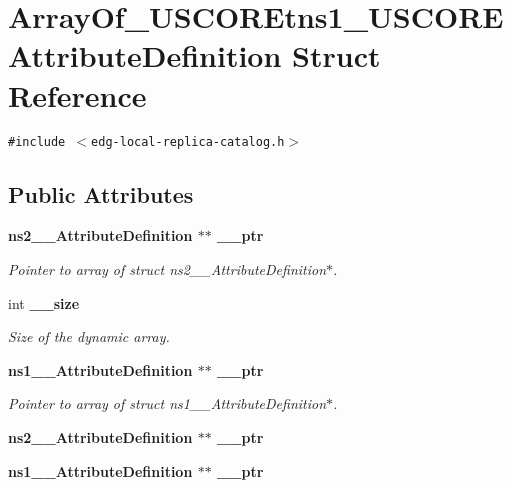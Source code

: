 \section{Array\-Of\_\-USCOREtns1\_\-USCOREAttribute\-Definition Struct Reference}
\label{structArrayOf__USCOREtns1__USCOREAttributeDefinition}
{\tt \#include $<$edg-local-replica-catalog.h$>$}

\subsection*{Public Attributes}
\begin{CompactItemize}
\item 
\bf{ns2\_\-\_\-Attribute\-Definition} $\ast$$\ast$ \bf{\_\-\_\-ptr}\label{structArrayOf__USCOREtns1__USCOREAttributeDefinition_829cfe4989a2404870040c0af3dd9a48}

\begin{CompactList}\small\item\em Pointer to array of struct ns2\_\-\_\-Attribute\-Definition$\ast$. \item\end{CompactList}\item 
int \bf{\_\-\_\-size}\label{structArrayOf__USCOREtns1__USCOREAttributeDefinition_3f167ff11f07d2e794e4eab428d5276d}

\begin{CompactList}\small\item\em Size of the dynamic array. \item\end{CompactList}\item 
\bf{ns1\_\-\_\-Attribute\-Definition} $\ast$$\ast$ \bf{\_\-\_\-ptr}\label{structArrayOf__USCOREtns1__USCOREAttributeDefinition_2fb94fbe0f97db3d663b3fc7da870fb2}

\begin{CompactList}\small\item\em Pointer to array of struct ns1\_\-\_\-Attribute\-Definition$\ast$. \item\end{CompactList}\item 
\bf{ns2\_\-\_\-Attribute\-Definition} $\ast$$\ast$ \textbf{\_\-\_\-ptr}\label{structArrayOf__USCOREtns1__USCOREAttributeDefinition_414a3bc217ff74a5652fd1efb7bdc54f}

\item 
\bf{ns1\_\-\_\-Attribute\-Definition} $\ast$$\ast$ \textbf{\_\-\_\-ptr}\label{structArrayOf__USCOREtns1__USCOREAttributeDefinition_ccfdbbf80f1d1226f9e5cf67ba2759e1}

\end{CompactItemize}


